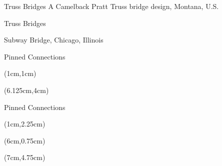 \documentclass[9pt, xcolor={svgnames, x11names},professionalfonts]{beamer}
\begin{document}

\begin{frame}{Truss Bridges}
	\centering
	A Camelback Pratt Truss bridge design, Montana, U.S.

\end{frame}


\begin{frame}{Truss Bridges}

	\centering
	Subway Bridge, Chicago, Illinois

\end{frame}


\begin{frame}{Pinned Connections}


	\begin{textblock*}{5cm}(1cm,1cm)

	\end{textblock*}

	\begin{textblock*}{5cm}(6.125cm,4cm)

	\end{textblock*}

\end{frame}


\begin{frame}{Pinned Connections }


	\begin{textblock*}{6.5cm}(1cm,2.25cm)

	\end{textblock*}

	\begin{textblock*}{6cm}(6cm,0.75cm)

	\end{textblock*}

	\begin{textblock*}{4.75cm}(7cm,4.75cm)

	\end{textblock*}

\end{frame}
\end{document}
